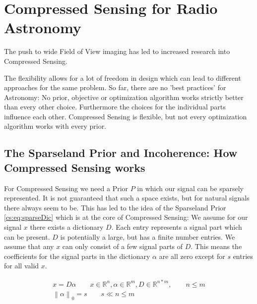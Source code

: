 \section{Compressed Sensing for Radio Astronomy} \label{cs}
The push to wide Field of View imaging has led to increased research into Compressed Sensing. 



The flexibility allows for a lot of freedom in design which can lead to different approaches for the same problem. So far, there are no 'best practices' for Astronomy: No prior, objective or optimization algorithm works strictly better than every other choice. Furthermore the choices for the individual parts influence each other. Compressed Sensing is flexible, but not every optimization algorithm works with every prior.



\subsection{The Sparseland Prior and Incoherence: How Compressed Sensing works}
For Compressed Sensing we need a Prior $P$ in which our signal can be sparsely represented. It is not guaranteed that such a space exists, but for natural signals there always seem to be. This has led to the idea of the Sparseland Prior \eqref{cs:eq:sparseDic} which is at the core of Compressed Sensing: We assume for our signal $x$ there exists a dictionary $D$. Each entry represents a signal part which can be present. $D$ is potentially a large, but has a finite number entries. We assume that any $x$ can only consist of a few signal parts of $D$. This means the coefficients for the signal parts in the dictionary $\alpha$ are all zero except for $s$ entries for all valid $x$. 

\begin{equation} \label{cs:eq:sparseDic}
	\begin{split}
		x = D \alpha  \qquad  x \in \mathbb{R}^{n}, \alpha \in \mathbb{R}^{m}, D \in \mathbb{R}^{n*m}, \qquad n \leq m \\
		\left \| \alpha \right \|_0 = s \qquad s \ll n \leq m
	\end{split}
\end{equation}


